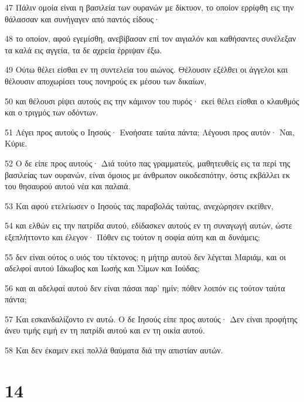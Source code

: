 \par 47 Πάλιν ομοία είναι η βασιλεία των ουρανών με δίκτυον, το οποίον ερρίφθη εις την θάλασσαν και συνήγαγεν από παντός είδους·
\par 48 το οποίον, αφού εγεμίσθη, ανεβίβασαν επί τον αιγιαλόν και καθήσαντες συνέλεξαν τα καλά εις αγγεία, τα δε αχρεία έρριψαν έξω.
\par 49 Ούτω θέλει είσθαι εν τη συντελεία του αιώνος. Θέλουσιν εξέλθει οι άγγελοι και θέλουσιν αποχωρίσει τους πονηρούς εκ μέσου των δικαίων,
\par 50 και θέλουσι ρίψει αυτούς εις την κάμινον του πυρός· εκεί θέλει είσθαι ο κλαυθμός και ο τριγμός των οδόντων.
\par 51 Λέγει προς αυτούς ο Ιησούς· Ενοήσατε ταύτα πάντα; Λέγουσι προς αυτόν· Ναι, Κύριε.
\par 52 Ο δε είπε προς αυτούς· Διά τούτο πας γραμματεύς, μαθητευθείς εις τα περί της βασιλείας των ουρανών, είναι όμοιος με άνθρωπον οικοδεσπότην, όστις εκβάλλει εκ του θησαυρού αυτού νέα και παλαιά.
\par 53 Και αφού ετελείωσεν ο Ιησούς τας παραβολάς ταύτας, ανεχώρησεν εκείθεν,
\par 54 και ελθών εις την πατρίδα αυτού, εδίδασκεν αυτούς εν τη συναγωγή αυτών, ώστε εξεπλήττοντο και έλεγον· Πόθεν εις τούτον η σοφία αύτη και αι δυνάμεις;
\par 55 δεν είναι ούτος ο υιός του τέκτονος; η μήτηρ αυτού δεν λέγεται Μαριάμ, και οι αδελφοί αυτού Ιάκωβος και Ιωσής και Σίμων και Ιούδας;
\par 56 και αι αδελφαί αυτού δεν είναι πάσαι παρ' ημίν; πόθεν λοιπόν εις τούτον ταύτα πάντα;
\par 57 Και εσκανδαλίζοντο εν αυτώ. Ο δε Ιησούς είπε προς αυτούς· Δεν είναι προφήτης άνευ τιμής ειμή εν τη πατρίδι αυτού και εν τη οικία αυτού.
\par 58 Και δεν έκαμεν εκεί πολλά θαύματα διά την απιστίαν αυτών.

\chapter{14}

